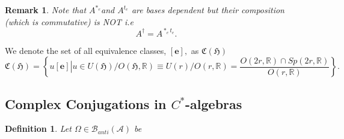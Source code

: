\documentclass[aps,preprint]{revtex4}
\newtheorem{definition}[theorem]{Definition}
\newtheorem{remark}[theorem]{Remark}
\begin{document}
\begin{remark}
Note that $A^{\ast _{e}}$and $A^{t_{e}}$ are bases dependent but their
composition (which is commutative) is \emph{NOT }i.e 
\begin{equation}
A^{\dagger }=A^{\ast _{e}t_{e}}.
\end{equation}
\end{remark}

We denote the set of all equivalence classes, $\left[ \mathbf{e}\right] ,$
as $\mathfrak{C}\left( \mathfrak{H}\right) $ 
\begin{equation}
\mathfrak{C}\left( \mathfrak{H}\right) =\left\{ \left. \overset{}{u\left[ 
\mathbf{e}\right] }\right\vert u\in U\left( \mathfrak{H}\right) /O\left( 
\mathfrak{H,}\mathbb{R}\right) \equiv U\left( r\right) /O\left( r\mathfrak{,}%
\mathbb{R}\right) =\frac{O\left( 2r,\mathbb{R}\right) \cap Sp\left( 2r,%
\mathbb{R}\right) }{O\left( r\mathfrak{,}\mathbb{R}\right) }\right\} .
\end{equation}

\subsection{Complex Conjugations in $C^{\ast}$-algebras}

\begin{definition}
Let $\Omega\in\mathcal{B}_{anti}\left( \mathcal{A}\right) $ be
\end{definition}
\end{document}
